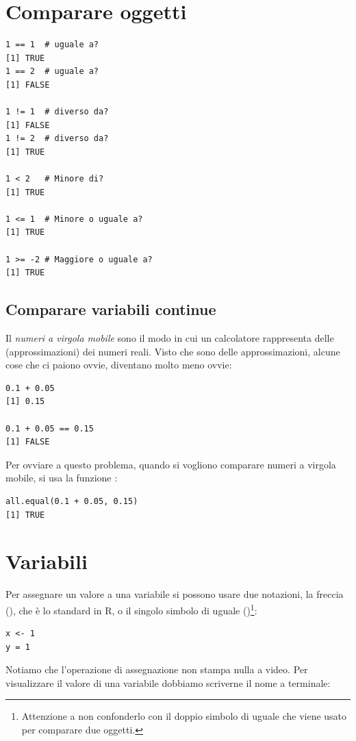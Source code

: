 \section{Comparare oggetti}

\begin{lstlisting}[style=Rstyle]
1 == 1  # uguale a?
[1] TRUE
1 == 2  # uguale a?
[1] FALSE

1 != 1  # diverso da?
[1] FALSE
1 != 2  # diverso da?
[1] TRUE

1 < 2   # Minore di?
[1] TRUE

1 <= 1  # Minore o uguale a?
[1] TRUE

1 >= -2 # Maggiore o uguale a?
[1] TRUE
\end{lstlisting}


\subsection{Comparare variabili continue}

Il \emph{numeri a virgola mobile} sono il modo in cui un calcolatore rappresenta delle (approssimazioni) dei numeri reali. Visto che sono delle approssimazioni, alcune cose che ci paiono ovvie, diventano molto meno ovvie:


\begin{lstlisting}[style=Rstyle]
0.1 + 0.05 
[1] 0.15

0.1 + 0.05 == 0.15 
[1] FALSE
\end{lstlisting}
%
Per ovviare a questo problema, quando si vogliono comparare numeri a virgola mobile, si usa la funzione :

\begin{lstlisting}[style=Rstyle]
all.equal(0.1 + 0.05, 0.15)
[1] TRUE
\end{lstlisting}


\section{Variabili}

Per assegnare un valore a una variabile si possono usare due notazioni, la freccia (\lsin{<-}), che \`e lo standard in R, o il singolo simbolo di uguale (\lsin{=})\footnote{Attenzione a non confonderlo con il doppio simbolo di uguale \lsin{==} che viene usato per comparare due oggetti.}:

\begin{lstlisting}[style=Rstyle]
x <- 1
y = 1
\end{lstlisting}
%
Notiamo che l'operazione di assegnazione non stampa nulla a video. Per visualizzare il valore di una variabile dobbiamo scriverne il nome a terminale:

